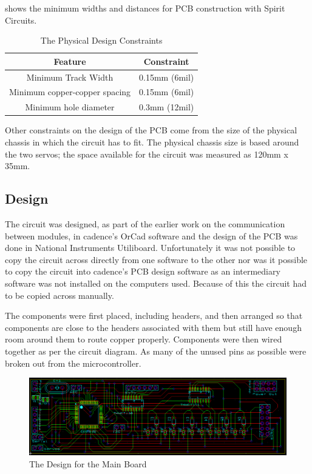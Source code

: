  shows the minimum widths and distances for PCB construction with Spirit Circuits.
\begin{table}[!htb]
	\centering
	\begin{tabular}{cc}
	\toprule
	\textbf{Feature} & \textbf{Constraint}\\
	\midrule
	Minimum Track Width & 0.15mm (6mil) \\
	Minimum copper-copper spacing & 0.15mm (6mil) \\
	Minimum hole diameter & 0.3mm (12mil) \\
	\bottomrule
	\end{tabular}
	\caption{The Physical Design Constraints}
	\label{Table:constraints}
\end{table}

Other constraints on the design of the PCB come from the size of the physical chassis in which the circuit has to fit. The physical chassis size is based around the two servos; the space available for the circuit was measured as 120mm x 35mm.

\subsection{Design}
The circuit was designed, as part of the earlier work on the communication between modules, in cadence's OrCad software and the design of the PCB was done in National Instruments Utiliboard. Unfortunately it was not possible to copy the circuit across directly from one software to the other nor was it possible to copy the circuit into cadence's PCB design software as an intermediary software was not installed on the computers used. Because of this the circuit had to be copied across manually.

The components were first placed, including headers, and then arranged so that components are close to the headers associated with them but still have enough room around them to route copper properly. Components were then wired together as per the circuit diagram. As many of the unused pins as possible were broken out from the microcontroller.

\begin{figure}[!htb]
  	\centering
  	\includegraphics[width=\textwidth]{Figures/MainPCBDesign.png}
  	\caption{The Design for the Main Board}
 	\label{Figure:MainPCBDesign}
\end{figure}

